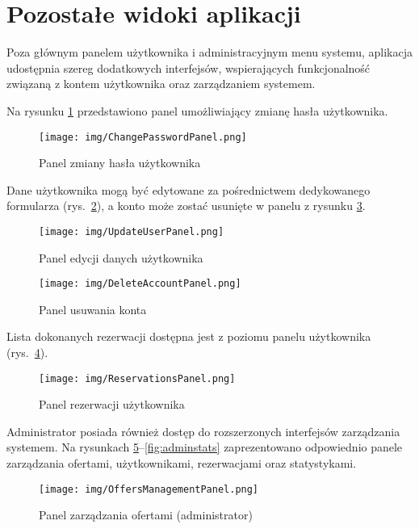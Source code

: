 \section{Pozostałe widoki aplikacji}

Poza głównym panelem użytkownika i administracyjnym menu systemu, aplikacja udostępnia szereg dodatkowych interfejsów, wspierających funkcjonalność związaną z kontem użytkownika oraz zarządzaniem systemem.

Na rysunku \ref{fig:changepass} przedstawiono panel umożliwiający zmianę hasła użytkownika.

\begin{figure}[H]
    \centering
    \texttt{[image: img/ChangePasswordPanel.png]}
    \caption{Panel zmiany hasła użytkownika}
    \label{fig:changepass}
\end{figure}

Dane użytkownika mogą być edytowane za pośrednictwem dedykowanego formularza (rys.~\ref{fig:edituser}), a konto może zostać usunięte w panelu z rysunku \ref{fig:deleteuser}.

\begin{figure}[H]
    \centering
    \texttt{[image: img/UpdateUserPanel.png]}
    \caption{Panel edycji danych użytkownika}
    \label{fig:edituser}
\end{figure}

\begin{figure}[H]
    \centering
    \texttt{[image: img/DeleteAccountPanel.png]}
    \caption{Panel usuwania konta}
    \label{fig:deleteuser}
\end{figure}

Lista dokonanych rezerwacji dostępna jest z poziomu panelu użytkownika (rys.~\ref{fig:userreservations}).

\begin{figure}[H]
    \centering
    \texttt{[image: img/ReservationsPanel.png]}
    \caption{Panel rezerwacji użytkownika}
    \label{fig:userreservations}
\end{figure}

Administrator posiada również dostęp do rozszerzonych interfejsów zarządzania systemem. Na rysunkach \ref{fig:adminoffers}–\ref{fig:adminstats} zaprezentowano odpowiednio panele zarządzania ofertami, użytkownikami, rezerwacjami oraz statystykami.

\begin{figure}[H]
    \centering
    \texttt{[image: img/OffersManagementPanel.png]}
    \caption{Panel zarządzania ofertami (administrator)}
    \label{fig:adminoffers}
\end{figure}

